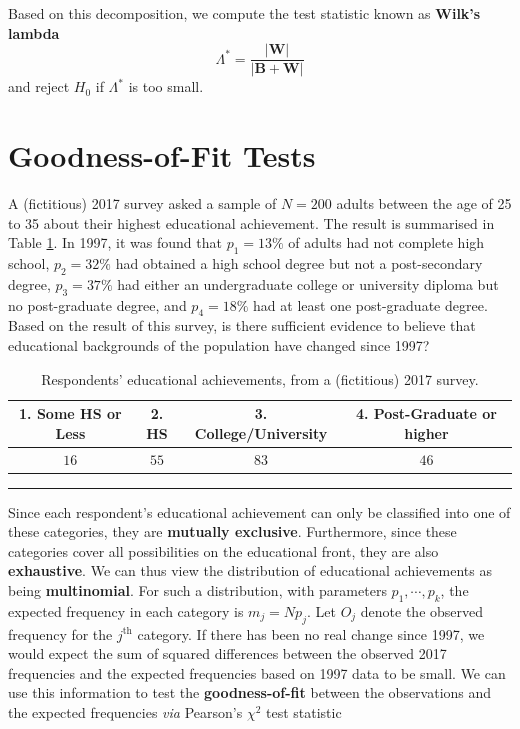 Based on this decomposition, we compute the test statistic known as \textbf{Wilk's lambda} 
\begin{equation*}
    \Lambda^{*}=\frac{|\bm{W}|}{|\bm{B}+\bm{W}|}
\end{equation*}
and reject $H_{0}$ if $\Lambda^{*}$ is too small. 



\section{Goodness-of-Fit Tests}
A (fictitious) 2017 survey asked a sample of $N=200$ adults between the age of 25 to 35 about their highest educational achievement. The result is summarised in Table \ref{tab:SA6}. In 1997, it was found that $p_1=13\%$ of adults had not complete high school, $p_2=32\%$ had obtained a high school degree but not a post-secondary degree, $p_3=37\%$ had either an undergraduate college or university diploma but no post-graduate degree, and $p_4=18\%$ had at least one post-graduate degree. Based on the result of this survey, is there sufficient evidence to believe that educational backgrounds of the population have changed since 1997?
     \begin{table}[!t]
         \centering
         \begin{tabular}{c c c c}
         \hline
        \textbf{1. Some HS or Less} & \textbf{2. HS} & \textbf{3. College/University} & \textbf{4. Post-Graduate or higher} \\
         \hline
        $16$ & $55$ & $83$ & $46$ \\
        \hline
         \end{tabular}
         \caption[\small Respondents' educational achievements]{\small Respondents' educational achievements, from a (fictitious) 2017 survey.}
         \label{tab:SA6}\hrule 
     \end{table}
\par Since each respondent's educational achievement can only be classified into one of these categories, they are  \textbf{mutually exclusive}. Furthermore, since these categories cover all possibilities on the educational front, they are also \textbf{exhaustive}. We can thus view the distribution of educational achievements as being \textbf{multinomial}. For such a distribution, with parameters $p_{1},\cdots,p_{k}$, the expected frequency in each category is $m_{j}=Np_{j}$. \newl  Let $O_{j}$ denote the observed frequency for the $j^{\text{th}}$ category. If there has been no real change since 1997, we would expect the sum of squared differences between the observed 2017 frequencies and the expected frequencies based on 1997 data to be small. We can use this information to test the \textbf{goodness-of-fit} between the observations and the expected frequencies \textit{via} Pearson's $\chi^{2}$ test statistic 
